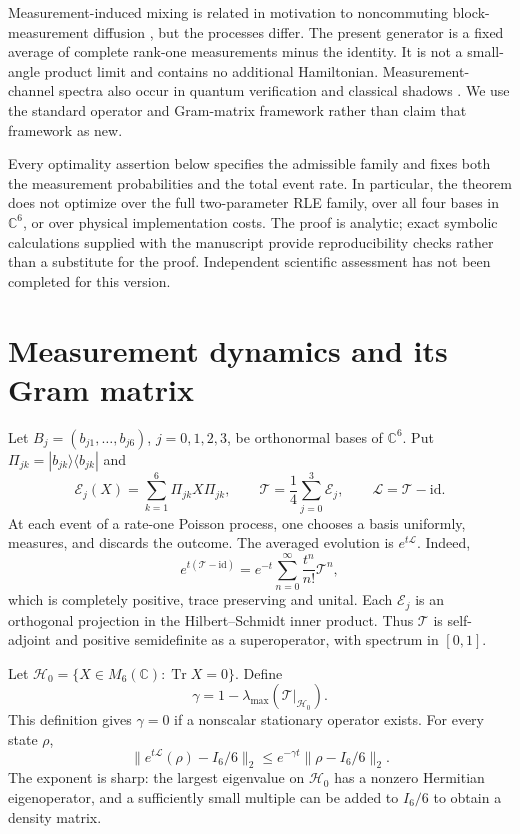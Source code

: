 \documentclass[11pt,a4paper]{article}
\theoremstyle{remark}
\DeclareMathOperator{\Tr}{Tr}
\newcommand{\id}{\mathrm{id}}
\newcommand{\C}{\mathbb C}
\newcommand{\E}{\mathcal E}
\newcommand{\T}{\mathcal T}
\newcommand{\HH}{\mathcal H_0}
\begin{document}
Measurement-induced mixing is related in motivation to noncommuting block-measurement diffusion \cite{eriksson}, but the processes differ. The present generator is a fixed average of complete rank-one measurements minus the identity. It is not a small-angle product limit and contains no additional Hamiltonian. Measurement-channel spectra also occur in quantum verification \cite{zhu} and classical shadows \cite{ippoliti}. We use the standard operator and Gram-matrix framework rather than claim that framework as new.

Every optimality assertion below specifies the admissible family and fixes both the measurement probabilities and the total event rate. In particular, the theorem does not optimize over the full two-parameter RLE family, over all four bases in $\C^6$, or over physical implementation costs. The proof is analytic; exact symbolic calculations supplied with the manuscript provide reproducibility checks rather than a substitute for the proof. Independent scientific assessment has not been completed for this version.

\section{Measurement dynamics and its Gram matrix}
Let $B_j=(b_{j1},\ldots,b_{j6})$, $j=0,1,2,3$, be orthonormal bases of $\C^6$. Put $\Pi_{jk}=|b_{jk}\rangle\langle b_{jk}|$ and
\begin{equation}\label{eq:channel}
 \E_j(X)=\sum_{k=1}^6\Pi_{jk}X\Pi_{jk},\qquad
 \T=\frac14\sum_{j=0}^3\E_j,\qquad \mathcal L=\T-\id.
\end{equation}
At each event of a rate-one Poisson process, one chooses a basis uniformly, measures, and discards the outcome. The averaged evolution is $e^{t\mathcal L}$. Indeed,
\[
 e^{t(\T-\id)}=e^{-t}\sum_{n=0}^{\infty}\frac{t^n}{n!}\T^n,
\]
which is completely positive, trace preserving and unital. Each $\E_j$ is an orthogonal projection in the Hilbert--Schmidt inner product. Thus $\T$ is self-adjoint and positive semidefinite as a superoperator, with spectrum in $[0,1]$.

Let $\HH=\{X\in M_6(\C):\Tr X=0\}$. Define
\begin{equation}\label{eq:gap}
 \gamma=1-\lambda_{\max}(\T|_{\HH}).
\end{equation}
This definition gives $\gamma=0$ if a nonscalar stationary operator exists. For every state $\rho$,
\begin{equation}\label{eq:decay}
 \|e^{t\mathcal L}(\rho)-I_6/6\|_2
 \le e^{-\gamma t}\|\rho-I_6/6\|_2.
\end{equation}
The exponent is sharp: the largest eigenvalue on $\HH$ has a nonzero Hermitian eigenoperator, and a sufficiently small multiple can be added to $I_6/6$ to obtain a density matrix.
\end{document}
